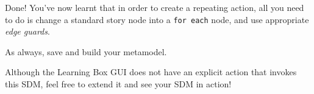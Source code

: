 \begin{stepbystep}
\item Done! You've now learnt that in order to create a repeating action, all you need to do is change a standard story node
into a \texttt{for each} node, and use appropriate \emph{edge guards}. 

\vspace{0.5cm}

\item As always, save and build your metamodel.

\vspace{0.5cm}

\item Although the Learning Box GUI does not have an explicit action that invokes this SDM, feel free to extend it and see your SDM in
action!

\end{stepbystep}

